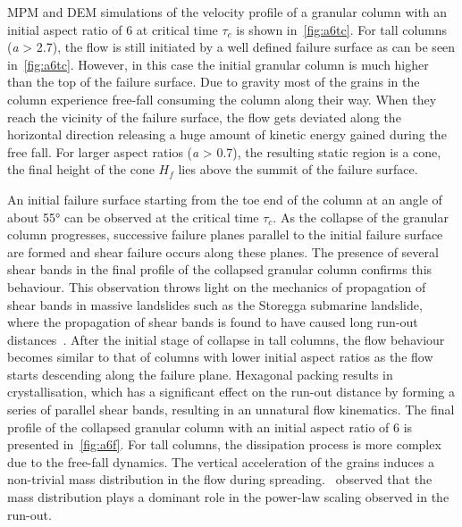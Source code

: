 MPM and DEM simulations of the velocity profile of a granular column with an 
initial aspect ratio of 6 at critical time $\tau_c$ is shown 
in~\cref{fig:a6tc}. For tall columns 
(\textit{a} > 2.7), the flow is still initiated by a well defined failure 
surface as can be seen in~\cref{fig:a6tc}. However, in this case the 
initial granular column is much higher than the top of the failure surface. Due 
to gravity most of the grains in the column experience free-fall 
consuming the column along their way. When they reach the vicinity of the 
failure surface, the flow gets deviated along the horizontal direction 
releasing a huge amount of kinetic energy gained during the free fall. For 
larger aspect ratios (\textit{a} > 0.7), the resulting static region is a cone, 
the final height of the cone $\textit{H}_{{f}}$ lies above the 
summit of the failure surface. 

An initial failure surface starting from the toe end 
of the column at an angle of about 55$\si{\degree}$ can be observed at the 
critical time $\tau_{c}$. As the collapse of the granular column progresses, 
successive failure planes parallel to the initial failure surface are formed 
and shear failure occurs along these planes. The presence of several shear 
bands in the final profile of the collapsed granular column confirms this 
behaviour. This observation throws light on the mechanics of propagation of 
shear bands in massive landslides such as the 
Storegga submarine landslide, where the propagation of shear bands is found to 
have caused long run-out distances~\citep{Dey2012}. After the initial stage of 
collapse in tall columns, the flow behaviour becomes similar to that of columns 
with lower initial aspect ratios as the flow starts descending along 
the failure plane. Hexagonal packing results in crystallisation, which has a 
significant effect on the run-out distance by forming a series of parallel 
shear bands, resulting in an unnatural flow kinematics. The final profile of 
the collapsed granular column with an initial aspect ratio of 6 is presented 
in~\cref{fig:a6f}. For tall columns, the dissipation process is more complex 
due to the free-fall dynamics. The vertical acceleration of the grains induces 
a non-trivial mass distribution in the flow during 
spreading.~\citet{Staron2007a} observed that the mass distribution plays 
a dominant role in the power-law scaling observed in the run-out.

